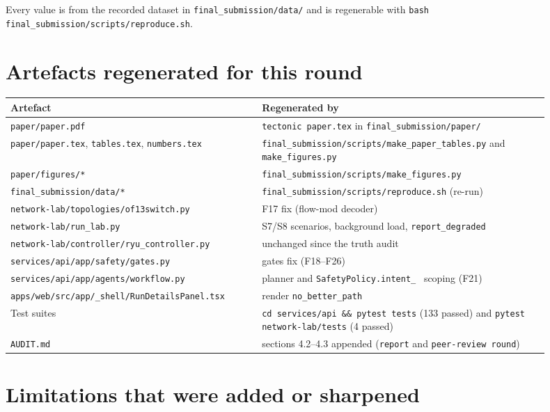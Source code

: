 \documentclass[11pt,a4paper]{article}
\begin{document}
\noindent Every value is from the recorded dataset in \texttt{final\_submission/data/}
and is regenerable with \texttt{bash final\_submission/scripts/reproduce.sh}.

\section{Artefacts regenerated for this round}

\begin{longtable}{@{}p{0.42\linewidth}p{0.48\linewidth}@{}}
\textbf{Artefact} & \textbf{Regenerated by} \\
\midrule
\texttt{paper/paper.pdf} & \texttt{tectonic paper.tex} in
\texttt{final\_submission/paper/} \\
\texttt{paper/paper.tex}, \texttt{tables.tex}, \texttt{numbers.tex} &
\texttt{final\_submission/scripts/make\_paper\_tables.py} and
\texttt{make\_figures.py} \\
\texttt{paper/figures/*} & \texttt{final\_submission/scripts/make\_figures.py} \\
\texttt{final\_submission/data/*} & \texttt{final\_submission/scripts/reproduce.sh} (re-run) \\
\texttt{network-lab/topologies/of13switch.py} & F17 fix (flow-mod decoder) \\
\texttt{network-lab/run\_lab.py} & S7/S8 scenarios, background load, \texttt{report\_degraded} \\
\texttt{network-lab/controller/ryu\_controller.py} & unchanged since the truth audit \\
\texttt{services/api/app/safety/gates.py} & gates fix (F18--F26) \\
\texttt{services/api/app/agents/workflow.py} & planner and
\texttt{SafetyPolicy.intent\_} \  scoping (F21) \\
\texttt{apps/web/src/app/\_shell/RunDetailsPanel.tsx} & render
\texttt{no\_better\_path} \\
Test suites & \texttt{cd services/api \&\& pytest tests} (133 passed) and
\texttt{pytest network-lab/tests} (4 passed) \\
\texttt{AUDIT.md} & sections 4.2--4.3 appended (\texttt{report} and
\texttt{peer-review round}) \\
\bottomrule
\end{longtable}

\section{Limitations that were added or sharpened}
\end{document}

